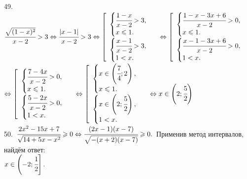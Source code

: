 \documentclass[12pt]{article}
\begin{document}
49. $\cfrac{\sqrt{(1-x)^2}}{x-2}>3\Leftrightarrow\cfrac{|x-1|}{x-2}>3\Leftrightarrow\left[\begin{array}{l} \begin{cases} \cfrac{1-x}{x-2}>3,\\
x\leqslant1.\end{cases}\\ \begin{cases} \cfrac{x-1}{x-2}>3,\\ 1<x.\end{cases}\end{array}\right.\Leftrightarrow\left[\begin{array}{l} \begin{cases} \cfrac{1-x-3x+6}{x-2}>0,\\ x\leqslant1.\end{cases}\\ \begin{cases} \cfrac{x-1-3x+6}{x-2}>0,\\ 1<x.\end{cases}\end{array}\right.$\\$\Leftrightarrow\left[\begin{array}{l} \begin{cases} \cfrac{7-4x}{x-2}>0,\\ x\leqslant1.\end{cases}\\ \begin{cases} \cfrac{5-2x}{x-2}>0,\\ 1<x.\end{cases}\end{array}\right.\Leftrightarrow\left[\begin{array}{l} \begin{cases} x\in\left(\cfrac{7}{4};2\right),\\ x\leqslant1.\end{cases}\\ \begin{cases} x\in\left(2;\cfrac{5}{2}\right),\\ 1<x.\end{cases}\end{array}\right.\Leftrightarrow x\in\left(2;\cfrac{5}{2}\right)$\\
50. $\cfrac{2x^2-15x+7}{\sqrt{14+5x-x^2}}\geqslant0\Leftrightarrow\cfrac{(2x-1)(x-7)}{\sqrt{-(x+2)(x-7)}}\geqslant0.$ Применив метод интервалов, найдём ответ:\\ $x\in\left(-2;\cfrac{1}{2}\right].$
\begin{figure}[ht!]
\end{figure}\\
\end{document}
